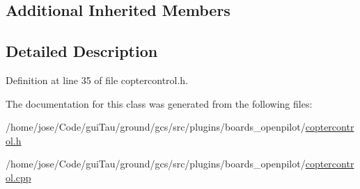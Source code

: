 \subsection*{Additional Inherited Members}


\subsection{Detailed Description}


Definition at line 35 of file coptercontrol.\-h.



The documentation for this class was generated from the following files\-:\begin{DoxyCompactItemize}
\item 
/home/jose/\-Code/gui\-Tau/ground/gcs/src/plugins/boards\-\_\-openpilot/\hyperlink{coptercontrol_8h}{coptercontrol.\-h}\item 
/home/jose/\-Code/gui\-Tau/ground/gcs/src/plugins/boards\-\_\-openpilot/\hyperlink{coptercontrol_8cpp}{coptercontrol.\-cpp}\end{DoxyCompactItemize}
